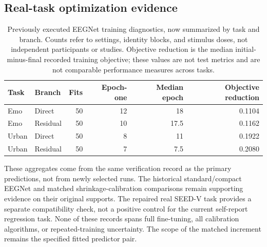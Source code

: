 \subsection{Real-task optimization evidence}
\begin{table}[ht]\centering\small
\caption{Previously executed EEGNet training diagnostics, now summarized by
task and branch. Counts refer to settings, identity blocks, and stimulus doses,
not independent participants or studies. Objective reduction is the median
initial-minus-final recorded training objective; these values are not test
metrics and are not comparable performance measures across tasks.}
\begin{tabular}{llrrrr}\toprule
Task & Branch & Fits & Epoch-one & Median epoch & Objective reduction\\\midrule
Emo & Direct & 50 & 12 & 18 & 0.1104\\
Emo & Residual & 50 & 10 & 17.5 & 0.1162\\
Urban & Direct & 50 & 8 & 11 & 0.1922\\
Urban & Residual & 50 & 7 & 7.5 & 0.2080\\
\bottomrule\end{tabular}
\end{table}
These aggregates come from the same verification record as the primary
predictions, not from newly selected runs. The historical standard/compact
EEGNet and matched shrinkage-calibration comparisons remain supporting
evidence on their original supports. The repaired real SEED-V task provides
a separate compatibility check, not a positive control for the current
self-report regression task. None of these records spans full fine-tuning,
all calibration algorithms, or repeated-training uncertainty. The scope of
the matched increment remains the specified fitted predictor pair.

